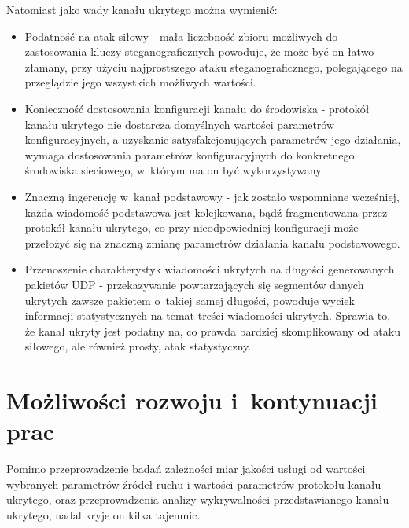 \documentclass[a4paper, twoside, 12pt]{report}
\begin{document}
    Natomiast jako wady kanału ukrytego można wymienić:
    \begin{itemize}
        \item Podatność na atak siłowy - mała liczebność zbioru możliwych do zastosowania
            kluczy steganograficznych powoduje, że może być on łatwo złamany,
            przy użyciu najprostszego ataku steganograficznego, polegającego
            na przeglądzie jego wszystkich możliwych wartości.
        \item Konieczność dostosowania konfiguracji kanału do środowiska - protokół
            kanału ukrytego nie dostarcza domyślnych wartości parametrów konfiguracyjnych, a
            uzyskanie satysfakcjonujących parametrów jego działania, wymaga dostosowania
            parametrów konfiguracyjnych do konkretnego środowiska sieciowego,
            w~którym ma on być wykorzystywany.
        \item Znaczną ingerencję w~kanał podstawowy - jak zostało wspomniane wcześniej,
            każda wiadomość podstawowa jest kolejkowana, bądź fragmentowana przez
            protokół kanału ukrytego, co przy nieodpowiedniej konfiguracji może
            przełożyć się na znaczną zmianę parametrów działania kanału podstawowego.
        \item Przenoszenie charakterystyk wiadomości ukrytych na długości generowanych pakietów UDP -
            przekazywanie powtarzających się segmentów danych ukrytych
            zawsze pakietem o~takiej samej długości, powoduje wyciek informacji
            statystycznych na temat treści wiadomości ukrytych. Sprawia to, że
            kanał ukryty jest podatny na, co prawda bardziej skomplikowany od ataku siłowego,
            ale również prosty, atak statystyczny.

    \end{itemize}
\chapter{Możliwości rozwoju i~kontynuacji prac}
    Pomimo przeprowadzenie badań zależności miar jakości usługi od wartości wybranych
    parametrów źródeł ruchu i wartości parametrów protokołu kanału ukrytego,
    oraz przeprowadzenia analizy wykrywalności przedstawianego kanału ukrytego, nadal kryje on kilka tajemnic.
\end{document}
